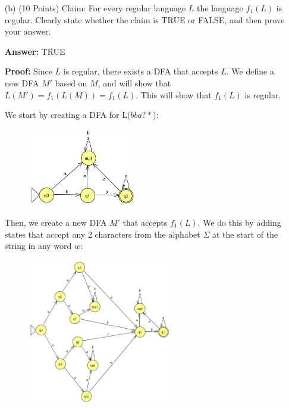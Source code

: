 \documentclass[12pt]{article}
\begin{document}
\begin{spacing}{1.5}
\begin{enumerate}
\begin{enumerate}
                        \item[(b)] (10 Points) Claim: For every regular language $L$ the language $f_1(L)$ is regular. Clearly state whether the claim is TRUE or FALSE, and then prove your answer.

                              \textbf{Answer:} TRUE

                              \textbf{Proof:} Since $L$ is regular, there exists a DFA that accepts $L$. We define a new DFA $M'$ based on $M$, and will show that $L(M') = f_1(L(M))=f_1(L)$. This will show that $f_1(L)$ is regular.

                              We start by creating a DFA for L($bba?*$):
                              \begin{figure}[h!]
                                    \centering
                                    \includegraphics[width=0.45\textwidth]{img/q2/q2b(M).png}
                              \end{figure}
                              \newpage
                              Then, we create a new DFA $M'$ that accepts $f_1(L)$. We do this by adding states that accept any 2 characters from the alphabet $\Sigma$ at the start of the string in any word $w$:

                              \begin{figure}[h!]
                                    \centering
                                    \includegraphics[width=0.6\textwidth]{img/q2/q2b(M').png}
                              \end{figure}


\end{enumerate}
\end{enumerate}
\end{spacing}
\end{document}
